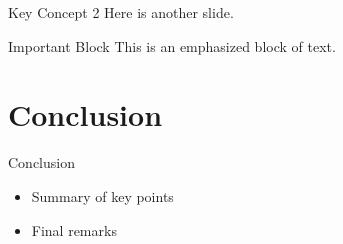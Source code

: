 \documentclass{beamer}
\begin{document}
\begin{frame}{Key Concept 2}
    Here is another slide.
    \begin{block}{Important Block}
        This is an emphasized block of text.
    \end{block}
\end{frame}

\section{Conclusion}

\begin{frame}{Conclusion}
    \begin{itemize}
        \item Summary of key points
        \item Final remarks
    \end{itemize}
\end{frame}
\end{document}
